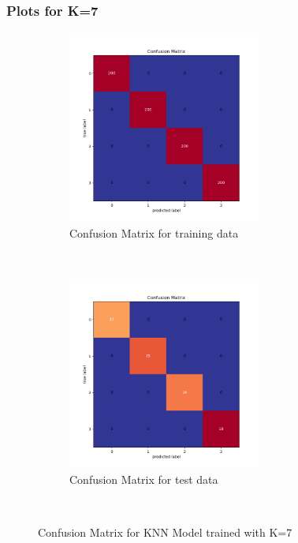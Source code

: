\newpage
\subsubsection{Plots for K=7}

\begin{figure}[!ht]
    \centering
    \begin{subfigure}[t]{0.5\textwidth}
        \centering
        \includegraphics[height=2.5in]{Dataset_1a/K_7_cmatrix_train_data.png}
        \caption{Confusion Matrix for training data}
    \end{subfigure}%
    ~ 
    \begin{subfigure}[t]{0.5\textwidth}
        \centering
        \includegraphics[height=2.5in]{Dataset_1a/K_7_cmatrix_test_data.png}
        \caption{Confusion Matrix for test data}
    \end{subfigure}%
    ~
    \caption{Confusion Matrix for KNN Model trained with K=7}
    \label{fig:3}
\end{figure}
